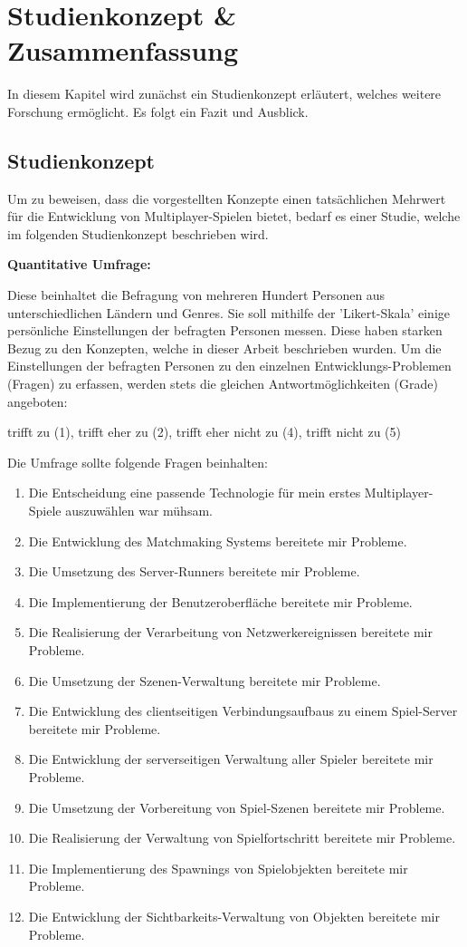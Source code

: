 \chapter{Studienkonzept \& Zusammenfassung}
\label{sec:zusammenfassung}

In diesem Kapitel wird zunächst ein Studienkonzept erläutert, welches weitere Forschung ermöglicht. Es folgt ein Fazit und Ausblick.

\section{Studienkonzept}
\label{studienkonzept}

Um zu beweisen, dass die vorgestellten Konzepte einen tatsächlichen Mehrwert für die Entwicklung von Multiplayer-Spielen bietet, bedarf es einer Studie, welche im folgenden Studienkonzept beschrieben wird.

\textbf{Quantitative Umfrage:}

Diese beinhaltet die Befragung von mehreren Hundert Personen aus unterschiedlichen Ländern und Genres. Sie soll mithilfe der 'Likert-Skala' \cite{Wikipedia.2022d} einige persönliche Einstellungen der befragten Personen messen. Diese haben starken Bezug zu den Konzepten, welche in dieser Arbeit beschrieben wurden. Um die Einstellungen der befragten Personen zu den einzelnen Entwicklungs-Problemen (Fragen) zu erfassen, werden stets die gleichen Antwortmöglichkeiten (Grade) angeboten:

trifft zu (1), trifft eher zu (2), trifft eher nicht zu (4), trifft nicht zu (5)

Die Umfrage sollte folgende Fragen beinhalten:

\begin{enumerate}
	\item Die Entscheidung eine passende Technologie für mein erstes Multiplayer-Spiele auszuwählen war mühsam.
	\item Die Entwicklung des Matchmaking Systems bereitete mir Probleme.
	\item Die Umsetzung des Server-Runners bereitete mir Probleme.
	\item Die Implementierung der Benutzeroberfläche bereitete mir Probleme.
	\item Die Realisierung der Verarbeitung von Netzwerkereignissen bereitete mir Probleme.
	\item Die Umsetzung der Szenen-Verwaltung bereitete mir Probleme.
	\item Die Entwicklung des clientseitigen Verbindungsaufbaus zu einem Spiel-Server bereitete mir Probleme.
	\item Die Entwicklung der serverseitigen Verwaltung aller Spieler bereitete mir Probleme.
	\item Die Umsetzung der Vorbereitung von Spiel-Szenen bereitete mir Probleme.
	\item Die Realisierung der Verwaltung von Spielfortschritt bereitete mir Probleme.
	\item Die Implementierung des Spawnings von Spielobjekten bereitete mir Probleme.
	\item Die Entwicklung der Sichtbarkeits-Verwaltung von Objekten bereitete mir Probleme.
\end{enumerate}

